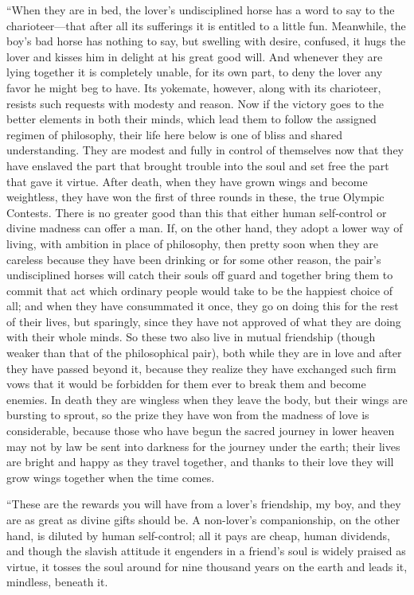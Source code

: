 “When they are in bed, the lover's undisciplined horse has a word to 
say to the charioteer---that after all its sufferings it
is entitled to a little fun. Meanwhile, the boy's bad horse has nothing
to say, but swelling with desire, confused, it hugs the lover and kisses
him in delight at his great good will. And whenever they are lying
together it is completely unable, for its own part, to deny the lover
any favor he might beg to have. Its yokemate, however, along with its
charioteer, resists such requests with modesty and reason. Now if the
victory goes to the better elements in both their minds, which lead them
to follow the assigned regimen of philosophy, their life here below is
one of bliss and shared understanding. They are modest and fully
in control of themselves now that they have enslaved the part that
brought trouble into the soul and set free the part that gave it virtue.
After death, when they have grown wings and become weightless, they have
won the first of three rounds in these, the true Olympic Contests. There
is no greater good than this that either human self-control or divine
madness can offer a man. If, on the other hand, they adopt a lower way
of living, with ambition in place of philosophy, then pretty soon when 
they are careless because they have been drinking or for some
other reason, the pair's undisciplined horses will catch their souls off
guard and together bring them to commit that act which ordinary people
would take to be the happiest choice of all; and when they have
consummated it once, they go on doing this for the rest of their lives,
but sparingly, since they have not approved of what they are doing with
their whole minds. So these two also live in mutual friendship (though
weaker than that of the philosophical pair), both while they are in love
and after they have passed beyond it, because they realize they
have exchanged such firm vows that it would be forbidden for them ever
to break them and become enemies. In death they are wingless when they
leave the body, but their wings are bursting to sprout, so the prize
they have won from the madness of love is considerable, because those
who have begun the sacred journey in lower heaven may not by law be sent
into darkness for the journey under the earth; their lives are bright
and happy as they travel together, and thanks to their love they
will grow wings together when the time comes.

“These are the rewards you will have from a lover's friendship, my boy,
and they are as great as divine gifts should be. A non-lover's
companionship, on the other hand, is diluted by human self-control; all
it pays are cheap, human dividends, and though the slavish attitude it
engenders in a friend's soul is widely praised as virtue, it tosses the
soul around for nine thousand years on the earth and
leads it, mindless, beneath it.

